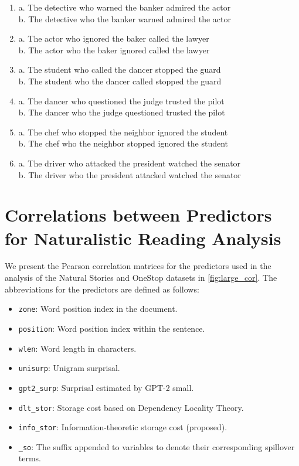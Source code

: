\documentclass[11pt]{article}
\begin{document}
\begin{enumerate}[label={(\arabic*)}, nosep]
  \item a. The detective who warned the banker admired the actor \\ b. The detective who the banker warned admired the actor
  \item a. The actor who ignored the baker called the lawyer \\ b. The actor who the baker ignored called the lawyer
  \item a. The student who called the dancer stopped the guard \\ b. The student who the dancer called stopped the guard
  \item a. The dancer who questioned the judge trusted the pilot \\ b. The dancer who the judge questioned trusted the pilot
  \item a. The chef who stopped the neighbor ignored the student \\ b. The chef who the neighbor stopped ignored the student
  \item a. The driver who attacked the president watched the senator \\ b. The driver who the president attacked watched the senator
\end{enumerate}



\section{Correlations between Predictors for Naturalistic Reading Analysis}
\label{app:cor}

We present the Pearson correlation matrices for the predictors used in the analysis of the Natural Stories and OneStop datasets in \cref{fig:large_cor}.
The abbreviations for the predictors are defined as follows:
\begin{itemize}[noitemsep]
    \item \texttt{zone}: Word position index in the document.
    \item \texttt{position}: Word position index within the sentence.
    \item \texttt{wlen}: Word length in characters.
    \item \texttt{unisurp}: Unigram surprisal.
    \item \texttt{gpt2\_surp}: Surprisal estimated by GPT-2 small.
    \item \texttt{dlt\_stor}: Storage cost based on Dependency Locality Theory.
    \item \texttt{info\_stor}: Information-theoretic storage cost (proposed).
    \item \texttt{\_so}: The suffix appended to variables to denote their corresponding spillover terms.
\end{itemize}
\end{document}
